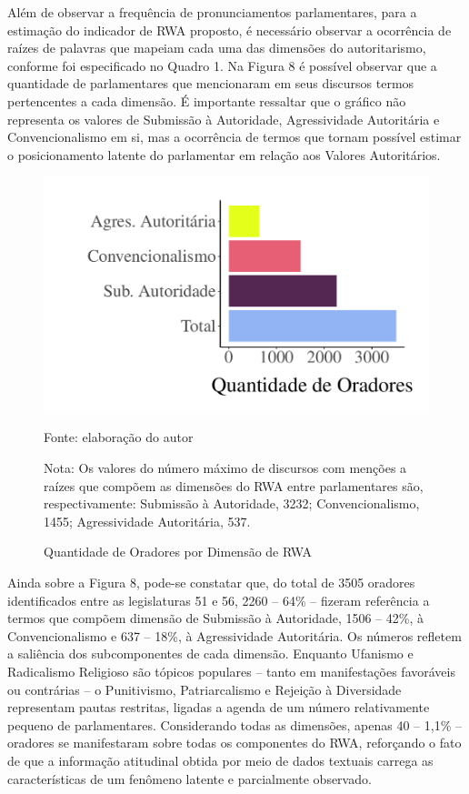 \documentclass[
12pt,				%
openright,			%
twoside,			%
a4paper,			%
english,			%
french,				%
spanish,			%
brazil				%
]{abntex2}
\begin{document}
Além de observar a frequência de pronunciamentos parlamentares, para a estimação do indicador de RWA proposto, é necessário observar a ocorrência de raízes de palavras que mapeiam cada uma das dimensões do autoritarismo, conforme foi especificado no Quadro 1. Na Figura 8 é possível observar que a quantidade de parlamentares que mencionaram em seus discursos termos pertencentes a cada dimensão. É importante ressaltar que o gráfico não representa os valores de Submissão à Autoridade, Agressividade Autoritária e Convencionalismo em si, mas a ocorrência de termos que tornam possível estimar o posicionamento latente do parlamentar em relação aos Valores Autoritários.

\begin{figure}[h]
	\caption{Quantidade de Oradores por Dimensão de RWA}
	\label{fig:qtd_deps_rwa}
	\centering
	\includegraphics[width=.6\linewidth]{figures/qtd_oradores_rwa}
	
	Fonte: elaboração do autor
	\begin{flushleft}
	Nota: Os valores do número máximo de discursos com menções a raízes que compõem as dimensões do RWA entre parlamentares são, respectivamente: Submissão à Autoridade, 3232; Convencionalismo, 1455; Agressividade Autoritária, 537. 
	\end{flushleft} 	
\end{figure}

Ainda sobre a Figura 8, pode-se constatar que, do total de 3505 oradores identificados entre as legislaturas 51 e 56, 2260 -- 64{\%} -- fizeram referência a termos que compõem dimensão de Submissão à Autoridade, 1506 -- 42{\%}, à Convencionalismo e 637 -- 18{\%}, à Agressividade Autoritária. Os números refletem a saliência dos subcomponentes de cada dimensão. Enquanto Ufanismo e Radicalismo Religioso são tópicos populares -- tanto em manifestações favoráveis ou contrárias -- o Punitivismo, Patriarcalismo e Rejeição à Diversidade representam pautas restritas, ligadas a agenda de um número relativamente pequeno de parlamentares. Considerando todas as dimensões, apenas 40 -- 1,1{\%} -- oradores se manifestaram sobre todas os componentes do RWA, reforçando o fato de que a informação atitudinal obtida por meio de dados textuais carrega as características de um fenômeno latente e parcialmente observado. 
\end{document}
